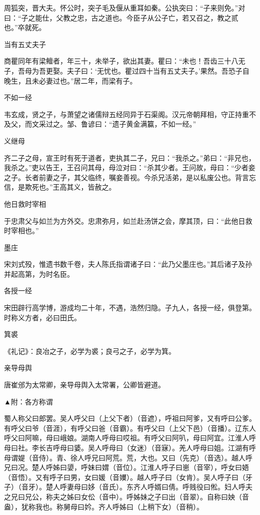 \documentclass[a4paper,12pt,UTF8,twoside]{ctexbook}
\begin{document}
    周狐突，晋大夫。怀公时，突子毛及偃从重耳如秦。公执突曰：“子来则免。”对曰：“子之能仕，父教之忠，古之道也。今臣子从公子亡，若又召之，教之贰也。”卒就死。
    
    当有五丈夫子
    
    商瞿同年有梁鳣者，年三十，未举子，欲出其妻。瞿曰：“未也！吾齿三十八无子，吾母为吾更娶。夫子曰：‘无忧也。瞿过四十当有五丈夫子。’果然。吾恐子自晚生，且未必妻过也。”居二年，而梁有子。
    
    不如一经
    
    韦玄成，贤之子，与萧望之诸儒辩五经同异于石渠阁。汉元帝朝拜相，守正持重不及父，而文采过之。邹、鲁谚曰：“遗子黄金满籯，不如一经。”
    
    义继母
    
    齐二子之母，宣王时有死于道者，吏执其二子，兄曰：“我杀之。”弟曰：“非兄也，我杀之。”吏以告王，王召问其母，母泣对曰：“杀其少者。王问故，母曰：“少者妾之子。长者前妻之子，其父临终，嘱妾善视。今杀兄活弟，是以私废公也。背言忘信，是欺死也。”王高其义，皆赦之。
    
    他日救时宰相
    
    于忠肃父与如兰为方外交。忠肃弥月，如兰赴汤饼之会，摩其顶，曰：“此他日救时宰相也。”
    
    墨庄
    
    宋刘式殁，惟遗书数千卷，夫人陈氏指谓诸子曰：“此乃父墨庄也。”其后诸子及孙并起高第，为时名臣。
    
    各授一经
    
    宋田辟行高学博，游成均二十年，不遇，浩然归隐。子九人，各授一经，俱登第。时称义方者，必曰田氏。
    
    箕裘
    
    《礼记》：良冶之子，必学为裘；良弓之子，必学为箕。
    
    亲导母舆
    
    唐崔邠为太常卿，亲导母舆入太常署，公卿皆避道。
    
    ▲附：各方称谓
    
    蜀人称父曰郎罢。吴人呼父曰（上父下者）（音遮），呼祖曰阿爹，又有呼曰公爹。有呼父曰爷（音涯），有呼父曰爸（音霸）。有呼父曰（上父下邑）（音播）。辽东人呼父曰阿嘛，母曰峨娘。湖南人呼母曰哎祖。有呼父曰阿叭，母曰阿宜。江淮人呼母曰社。李长吉呼母曰婱。吴人呼母曰（女迷）（音寐）。羌人呼母曰姐。江湖有呼母谓媞（音侍）。青、徐人呼兄曰阿荒。荒，大也。又曰（先克）（音选）。越人呼兄曰况。楚人呼姊曰嬃，呼妹曰媦（音位）。江淮人呼子曰崽（音宰），呼女曰娪（音悟）。又有呼子曰男，女曰媛（音嬽）。越人呼子曰（女肯）。吴人呼子曰（牙子）（音牙）。楚人呼妻母曰姼（音氏）。东齐人呼婿曰倩。呼贱役曰倯。妇人呼夫之兄曰兄公，称夫之姊曰女伀（音中）。呼姊妹之子曰出（音翠）。自称曰姎（音盎），犹称我也。称舅母曰妗。齐人呼姊曰（上稍下女）（音稍）。
    
\end{document}
